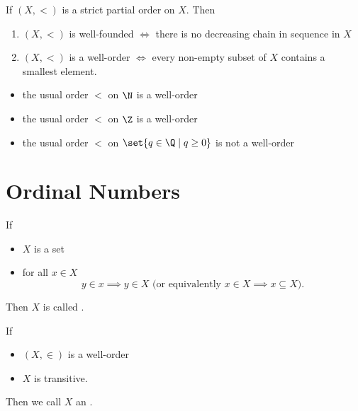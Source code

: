 \begin{remark}
    If $(X, <)$ is a strict partial order on $X$.
    Then 
    \begin{enumerate}[label=(\roman*)]
        \item $(X, <)$ is well-founded $\iff$ there is no decreasing chain in sequence in $X$
        \item $(X, <)$ is a well-order $\iff$ every non-empty subset of $X$ contains a smallest element.
    \end{enumerate}
\end{remark}

\begin{example}
    \begin{itemize}
        \item the usual order $<$ on $\N$ is a well-order
        \item the usual order $<$ on $\Z$ is a well-order
        \item the usual order $<$ on $\set{q \in \Q \mid q \geq 0}$ is not a well-order
    \end{itemize}
\end{example}

\section{Ordinal Numbers}

\begin{definition}
    If
    \begin{itemize}
        \item $X$ is a set
        \item for all $x \in X$
        $$ y \in x \implies y \in X \text{ (or equivalently $x \in X \implies x \subseteq X$)}.$$
    \end{itemize}     
    Then $X$ is called .
\end{definition}

\begin{definition}
    If
    \begin{itemize}
        \item $(X , \in)$ is a well-order
        \item $X$ is transitive.
    \end{itemize}
    Then we call $X$ an .
\end{definition}


